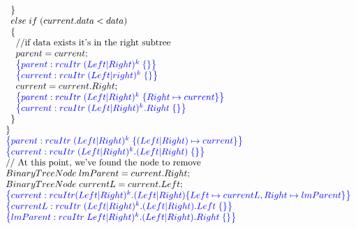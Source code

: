 \[\begin{array}{@{}l@{}}
        \;\;\;\;\}\\
        \;\;\;\;else \;if\; (current.data < data)\\
        \;\;\;\;\{\\
            \;\;\;\;\;\;\text{//if data exists it's in the right subtree}\\
            \;\;\;\;\;\;parent = current; \\
            \;\;\;\;\;\;\specline{parent:rcuItr\; (Left|Right)^{k} \; \{ \} }\\
            \;\;\;\;\;\;\specline{current:rcuItr\; (Left|right)^{k} \; \{ \} }\\
            \;\;\;\;\;\;current = current.Right; \\
            \;\;\;\;\;\;\specline{parent:rcuItr\; (Left|Right)^{k} \; \{ Right\mapsto current\} }\\
            \;\;\;\;\;\;\specline{current:rcuItr\; (Left|Right)^{k}.Right \; \{ \} }\\
        \;\;\;\;\}\\
    \;\;\} \\
    \;\;\specline{parent:rcuItr\; (Left|Right)^{k} \; \{(Left|Right)\mapsto current\} }\\
    \;\;\specline{current:rcuItr\; (Left|Right)^{k}.(Left|Right) \; \{ \} }\\
    \;\;\text{// At this point, we've found the node to remove}\\
    \;\;BinaryTreeNode \;lmParent = current.Right;\\
    \;\;BinaryTreeNode \;currentL = current.Left;\\
    \;\;\specline{current:rcuItr (Left|Right)^{k}.(Left|Right) \{ Left \mapsto currentL, Right \mapsto lmParent\} }\\
    \;\;\specline{currentL:rcuItr\; (Left|Right)^{k}.(Left|Right).Left \; \{\} }\\
     \;\;\specline{lmParent:rcuItr\; Left|Right)^{k}.(Left|Right).Right \; \{ \} }\\
    
\end{array}
\]
